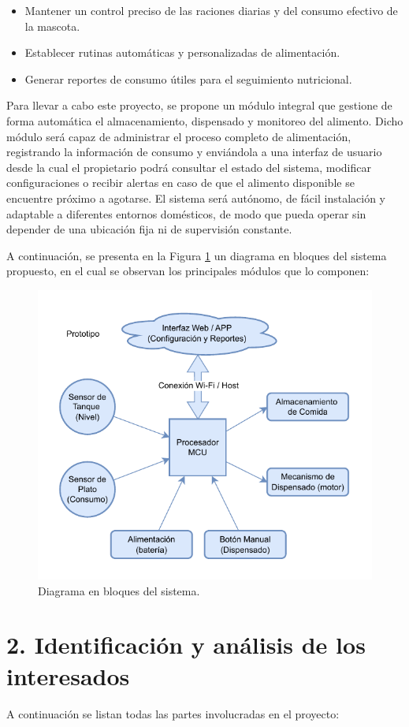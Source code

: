 \documentclass[
11pt, %
]{charter}
\begin{document}
\begin{itemize}
\item Mantener un control preciso de las raciones diarias y del consumo efectivo de la mascota.
\item Establecer rutinas automáticas y personalizadas de alimentación.
\item Generar reportes de consumo útiles para el seguimiento nutricional.
\end{itemize}

\vspace{2.5cm}

Para llevar a cabo este proyecto, se propone un módulo integral que gestione de forma automática el almacenamiento, dispensado y monitoreo del alimento. Dicho módulo será capaz de administrar el proceso completo de alimentación, registrando la información de consumo y enviándola a una interfaz de usuario desde la cual el propietario podrá consultar el estado del sistema, modificar configuraciones o recibir alertas en caso de que el alimento disponible se encuentre próximo a agotarse.
El sistema será autónomo, de fácil instalación y adaptable a diferentes entornos domésticos, de modo que pueda operar sin depender de una ubicación fija ni de supervisión constante.

A continuación, se presenta en la Figura \ref{fig:diagBloques} un diagrama en bloques del sistema propuesto, en el cual se observan los principales módulos que lo componen:

\begin{figure}[htpb]
\centering 
\includegraphics[width=.65\textwidth]{./Figuras/diagBloques.pdf}
\caption{Diagrama en bloques del sistema.}
\label{fig:diagBloques}
\end{figure}


\section{2. Identificación y análisis de los interesados}
\label{sec:interesados}
A continuación se listan todas las partes involucradas en el proyecto:
\end{document}
